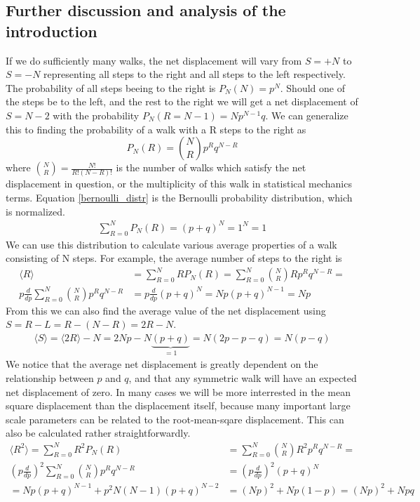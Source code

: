 \subsection{Further discussion and analysis of the introduction}\label{further_introduction}
If we do sufficiently many walks, the net displacement will vary from $S=+N$ to $S=-N$ representing all steps to the right and all steps to the left respectively. 
The probability of all steps beeing to the right is $P_N(N) = p^N$. 
Should one of the steps be to the left, and the rest to the right we will get a net displacement of $S = N-2$ with the probability $P_N(R = N-1) = Np^{N-1}q$. 
We can generalize this to finding the probability of a walk with a R steps to the right as 
\begin{equation}\label{bernoulli_distr}
 P_N(R) = {N\choose R}p^{R}q^{N-R}
\end{equation}
where ${N\choose R}=\frac{N!}{R!(N-R)!}$ is the number of walks which satisfy the net displacement in question, or the multiplicity of this walk in statistical mechanics terms. 
Equation \ref{bernoulli_distr} is the Bernoulli probability distribution, which is normalized.
\begin{align*}
 \sum\limits_{R=0}^N P_N(R) = (p+q)^N = 1^N = 1
\end{align*}
We can use this distribution to calculate various average properties of a walk consisting of N steps. 
For example, the average number of steps to the right is
\begin{align*}
 \langle R\rangle &=  \sum\limits_{R=0}^N RP_N(R) =  \sum\limits_{R=0}^N {N\choose R}Rp^Rq^{N-R} = \\
 p\frac{d}{dp} \sum\limits_{R=0}^N {N\choose R}p^Rq^{N-R} &= p\frac{d}{dp}(p+q)^N = Np(p+q)^{N-1} = Np
\end{align*}
From this we can also find the average value of the net displacement using $S = R-L = R-(N-R) = 2R-N$.
\begin{align*}
 \langle S\rangle = \langle2R\rangle -N = 2Np-N\underbrace{(p+q)}_{=1} = N(2p-p-q) = N(p-q)
\end{align*}
We notice that the average net displacement is greatly dependent on the relationship between $p$ and $q$, and that any symmetric walk will have an expected net displacement of zero. 
In many cases we will be more interrested in the mean square displacement than the displacement itself, because many important large scale parameters can be related to the root-mean-sqare displacement. 
This can also be calculated rather straightforwardly. 
\begin{align*}
  \langle R^2\rangle =  \sum\limits_{R=0}^N R^2P_N(R) &=  \sum\limits_{R=0}^N {N\choose R}R^2p^Rq^{N-R} = \\
 \left(p\frac{d}{dp}\right)^2 \sum\limits_{R=0}^N {N\choose R}p^Rq^{N-R} &= \left(p\frac{d}{dp}\right)^2(p+q)^N \\
 = Np(p+q)^{N-1} +p^2N(N-1)(p+q)^{N-2} &= (Np)^2 +Np(1-p) = (Np)^2 +Npq
\end{align*}
